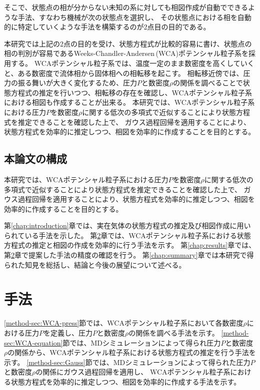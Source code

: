 \documentclass[titlepage]{jsreport}
\begin{document}
そこで、状態点の相が分からない未知の系に対しても相図作成が自動でできるような手法、すなわち機械が次の状態点を選択し、
その状態点における相を自動的に特定していくような手法を構築するのが2点目の目的である。

本研究では上記の2点の目的を受け、状態方程式が比較的容易に書け、状態点の相の判別が容易であるWeeks-Chandler-Andersen\,(WCA)ポテンシャル粒子系を採用する。
WCAポテンシャル粒子系では、温度一定のまま数密度を高くしていくと、ある数密度で流体相から固体相への相転移を起こす。
相転移近傍では、圧力の振る舞いが大きく変化するため、圧力$P$と数密度$\rho$の関係を調べることで状態方程式の推定を行いつつ、相転移の存在を確認し、WCAポテンシャル粒子系における相図も作成することが出来る。
本研究では、WCAポテンシャル粒子系における圧力$P$を数密度$\rho$に関する低次の多項式で近似することにより状態方程式を推定できることを確認した上で、
ガウス過程回帰を適用することにより、状態方程式を効率的に推定しつつ、相図を効率的に作成することを目的とする。


\section{本論文の構成} \label{intro-constitution}
本研究では、WCAポテンシャル粒子系における圧力$P$を数密度$\rho$に関する低次の多項式で近似することにより状態方程式を推定できることを確認した上で、
ガウス過程回帰を適用することにより、状態方程式を効率的に推定しつつ、相図を効率的に作成することを目的とする。

第\ref{chap:introduction}章では、実在気体の状態方程式の推定及び相図作成に用いられている手法を示した。
第\ref{chap:method}章では、WCAポテンシャル粒子系における状態方程式の推定と相図の作成を効率的に行う手法を示す。
第\ref{chap:results}章では、第\ref{chap:method}章で提案した手法の精度の確認を行う。
第\ref{chap:summary}章では本研究で得られた知見を総括し、結論と今後の展望について述べる。


\chapter{手法} \label{chap:method}
\ref{method-sec:WCA-press}節では、WCAポテンシャル粒子系において各数密度$\rho$における圧力$P$を定義し、圧力$P$と数密度$\rho$の関係を調べる手法を示す。
\ref{method-sec:WCA-equation}節では、MDシミュレーションによって得られ圧力$P$と数密度$\rho$の関係から、WCAポテンシャル粒子系における状態方程式の推定を行う手法を示す。
\ref{method-sec:Gauss}節では、MDシミュレーションによって得られた圧力$P$と数密度$\rho$の関係にガウス過程回帰を適用し、
WCAポテンシャル粒子系における状態方程式を効率的に推定しつつ、相図を効率的に作成する手法を示す。
\end{document}

